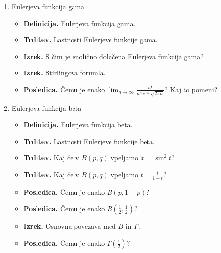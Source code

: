 \begin{enumerate}
\begin{itemize}
    \end{itemize}
    \item Eulerjeva funkcija gama
    \begin{itemize}
        \item \colorbox{purple!30}{\textbf{Definicija.}} Eulerjeva funkcija gama.
        \item \colorbox{blue!30}{\textbf{Trditev.}} Lastnosti Eulerjeve funkcije gama.
        \item \colorbox{blue!30}{\textbf{Izrek.}} S čim je enolično določena Eulerjeva funkcija gama?
        \item \colorbox{blue!30}{\textbf{Izrek.}} Stirlingova forumla.
        \item \colorbox{orange!30}{\textbf{Posledica.}} Čemu je enako \(\lim_{n \to \infty} \frac{n!}{n^n \, e^{-n} \, \sqrt{2 \pi n}}\)? Kaj to pomeni?
    \end{itemize}

    \item Eulerjeva funkcija beta
    \begin{itemize}
        \item \colorbox{purple!30}{\textbf{Definicija.}} Eulerjeva funkcija beta.
        \item \colorbox{blue!30}{\textbf{Trditev.}} Lastnosti Eulerjeve funkcije beta.
        \item \colorbox{blue!30}{\textbf{Trditev.}} Kaj če v \(B(p,q)\) vpeljamo \(x = \sin^2 t\)?
        \item \colorbox{blue!30}{\textbf{Trditev.}} Kaj če v \(B(p,q)\) vpeljamo \(t = \frac{t}{1+t}\)?
        \item \colorbox{orange!30}{\textbf{Posledica.}} Čemu je enako \(B(p, 1-p)\)?
        \item \colorbox{orange!30}{\textbf{Posledica.}} Čemu je enako \(B(\frac{1}{2}, \frac{1}{2})\)?
        \item \colorbox{blue!30}{\textbf{Izrek.}} Osnovna povezava med \(B\) in \(\Gamma\).
        \item \colorbox{orange!30}{\textbf{Posledica.}} Čemu je enako \(\Gamma(\frac{1}{2})\)?
    \end{itemize}
\end{enumerate}

